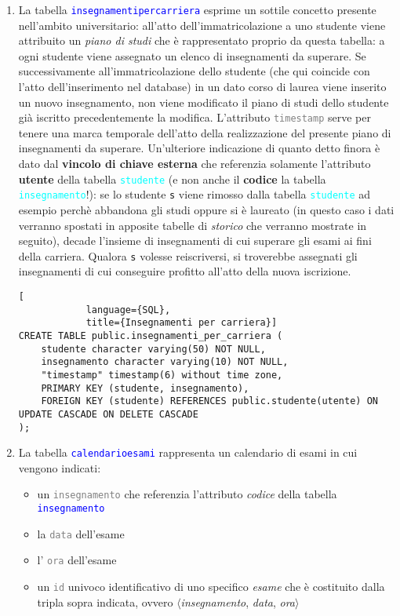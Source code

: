 \documentclass{article}
\newcommand{\tabb}[1]{\texttt{\textcolor{blue}{#1}}}
\newcommand{\tab}[1]{\texttt{\textcolor{cyan}{#1}}}
\newcommand{\attr}[1]{\texttt{\textcolor{gray}{#1}}}
\newcommand{\und}[0]{\textunderscore}
\begin{document}
\begin{enumerate}
        \item La tabella \tabb{insegnamenti\und per\und carriera} esprime un sottile concetto presente nell'ambito universitario: all'atto dell'immatricolazione a uno studente viene attribuito un \textit{piano di studi} che è rappresentato proprio da questa tabella: a ogni studente viene assegnato un elenco di insegnamenti da superare. Se successivamente all'immatricolazione dello studente (che qui coincide con l'atto dell'inserimento nel database) in un dato corso di laurea viene inserito un nuovo insegnamento, non viene modificato il piano di studi dello studente già iscritto precedentemente la modifica. L'attributo \attr{timestamp} serve per tenere una marca temporale dell'atto della realizzazione del presente piano di insegnamenti da superare. Un'ulteriore indicazione di quanto detto finora è dato dal \textbf{vincolo di chiave esterna} che referenzia solamente l'attributo \textbf{utente} della tabella \tab{studente} (e non anche il \textbf{codice} la tabella \tab{insegnamento}!): se lo studente \texttt{s} viene rimosso dalla tabella \tab{studente} ad esempio perchè abbandona gli studi oppure si è laureato (in questo caso i dati verranno spostati in apposite tabelle di \textit{storico} che verranno mostrate in seguito), decade l'insieme di insegnamenti di cui superare gli esami ai fini della carriera. Qualora \texttt{s} volesse reiscriversi, si troverebbe assegnati gli insegnamenti di cui conseguire profitto all'atto della nuova iscrizione.
        \begin{lstlisting}[
            language={SQL},
            title={Insegnamenti per carriera}]
CREATE TABLE public.insegnamenti_per_carriera (
    studente character varying(50) NOT NULL,
    insegnamento character varying(10) NOT NULL,
    "timestamp" timestamp(6) without time zone,
    PRIMARY KEY (studente, insegnamento),
    FOREIGN KEY (studente) REFERENCES public.studente(utente) ON UPDATE CASCADE ON DELETE CASCADE
);
        \end{lstlisting}

        \item La tabella \tabb{calendario\und esami} rappresenta un calendario di esami in cui vengono indicati:
        \begin{itemize}
            \item un \attr{insegnamento} che referenzia l'attributo \textit{codice} della tabella \tabb{insegnamento}
            \item la \attr{data} dell'esame
            \item l' \attr{ora} dell'esame
            \item un \attr{id} univoco identificativo di uno specifico \textit{esame} che è costituito dalla tripla sopra indicata, ovvero $\langle$\textit{insegnamento}, \textit{data}, \textit{ora}$\rangle$


\end{itemize}
\end{enumerate}
\end{document}
